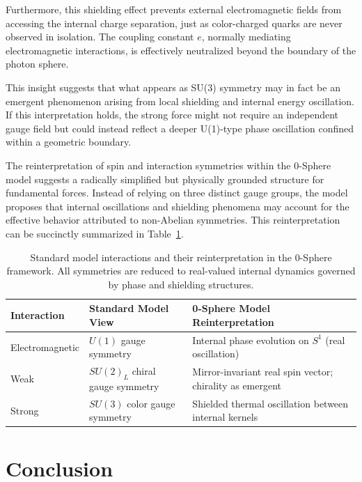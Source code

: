 \documentclass[12pt,letterpaper]{article} %
\begin{document}
Furthermore, this shielding effect prevents external electromagnetic fields from accessing the internal charge separation, just as color-charged quarks are never observed in isolation. The coupling constant \( e \), normally mediating electromagnetic interactions, is effectively neutralized beyond the boundary of the photon sphere.

This insight suggests that what appears as SU(3) symmetry may in fact be an emergent phenomenon arising from local shielding and internal energy oscillation. If this interpretation holds, the strong force might not require an independent gauge field but could instead reflect a deeper U(1)-type phase oscillation confined within a geometric boundary.

The reinterpretation of spin and interaction symmetries within the 0-Sphere model suggests a radically simplified but physically grounded structure for fundamental forces. Instead of relying on three distinct gauge groups, the model proposes that internal oscillations and shielding phenomena may account for the effective behavior attributed to non-Abelian symmetries. This reinterpretation can be succinctly summarized in Table~\ref{tab:gauge-summary}.

\begin{table}[t!]
\centering
\caption{Standard model interactions and their reinterpretation in the 0-Sphere framework. All symmetries are reduced to real-valued internal dynamics governed by phase and shielding structures.}
\label{tab:gauge-summary}
\renewcommand{\arraystretch}{1.4}
\begin{tabular}{p{3.8cm}p{5.5cm}p{5.5cm}}
\toprule
\textbf{Interaction} & \textbf{Standard Model View} & \textbf{0-Sphere Model Reinterpretation} \\
\midrule
Electromagnetic & $U(1)$ gauge symmetry & Internal phase evolution on $S^1$ (real oscillation) \\
\addlinespace[0.3cm]
Weak & $SU(2)_L$ chiral gauge symmetry & Mirror-invariant real spin vector; chirality as emergent \\
\addlinespace[0.3cm]
Strong & $SU(3)$ color gauge symmetry & Shielded thermal oscillation between internal kernels \\
\bottomrule
\end{tabular}
\end{table}


\section{Conclusion}
\end{document}
